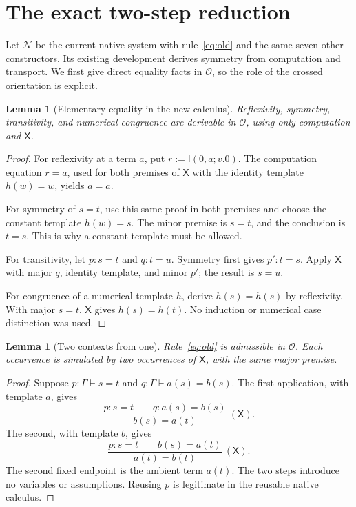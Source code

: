 \documentclass[11pt,letterpaper]{article}
\newtheorem{lemma}[theorem]{Lemma}
\theoremstyle{definition}\newtheorem{definition}[theorem]{Definition}
\theoremstyle{remark}\newtheorem{remark}[theorem]{Remark}
\newcommand{\N}{\mathcal N}
\newcommand{\Ocal}{\mathcal O}
\newcommand{\I}{\mathsf I}
\newcommand{\One}{\mathsf X}
\begin{document}
\section{The exact two-step reduction}
\label{sec:equivalence}
Let \(\N\) be the current native system with rule~\eqref{eq:old} and the
same seven other constructors. Its existing development derives symmetry
from computation and transport. We first give direct equality facts in
\(\Ocal\), so the role of the crossed orientation is explicit.

\begin{lemma}[Elementary equality in the new calculus]
Reflexivity, symmetry, transitivity, and numerical congruence are derivable
in \(\Ocal\), using only computation and \(\One\).
\end{lemma}
\begin{proof}
For reflexivity at a term \(a\), put \(r:=\I(0,a;v.0)\).
The computation equation \(r=a\), used for both premises of \(\One\)
with the identity template \(h(w)=w\), yields \(a=a\).

For symmetry of \(s=t\), use this same proof in both premises and choose
the constant template \(h(w)=s\). The minor premise is \(s=t\), and the
conclusion is \(t=s\). This is why a constant template must be allowed.

For transitivity, let \(p:s=t\) and \(q:t=u\). Symmetry first gives
\(p':t=s\). Apply \(\One\) with major \(q\), identity template, and
minor \(p'\); the result is \(s=u\).

For congruence of a numerical template \(h\), derive
\(h(s)=h(s)\) by reflexivity. With major \(s=t\), \(\One\) gives
\(h(s)=h(t)\). No induction or numerical case distinction was used.
\end{proof}

\begin{lemma}[Two contexts from one]
\label{lem:two}
Rule~\eqref{eq:old} is admissible in \(\Ocal\). Each occurrence is
simulated by two occurrences of \(\One\), with the same major premise.
\end{lemma}
\begin{proof}
Suppose \(p:\Gamma\vdash s=t\) and
\(q:\Gamma\vdash a(s)=b(s)\). The first application, with template
\(a\), gives
\[
 \frac{p:s=t\qquad q:a(s)=b(s)}{b(s)=a(t)}\ (\One).
\]
The second, with template \(b\), gives
\[
 \frac{p:s=t\qquad b(s)=a(t)}{a(t)=b(t)}\ (\One).
\]
The second fixed endpoint is the ambient term \(a(t)\). The two steps
introduce no variables or assumptions. Reusing \(p\) is legitimate in
the reusable native calculus.
\end{proof}
\end{document}
